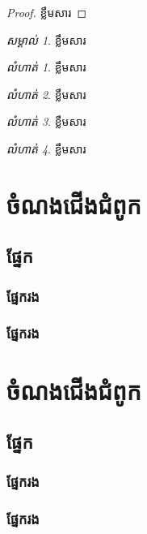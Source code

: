 \documentclass[a4paper,12pt,twoside]{book}
\newcommand{\KhOSML}{\fontspec[Script=Khmer]{Khmer OS Muol Light} \selectfont}
\theoremstyle{plain}
\theoremstyle{definition}
\theoremstyle{remark}
\newtheorem{remark}{\KhOSML សម្គាល់}%
\newtheorem{exercise}{\KhOSML លំហាត់}[chapter]
\begin{document}
\begin{proof}
ខ្លឹមសារ
\end{proof}

\begin{remark}
ខ្លឹមសារ
\end{remark}

\begin{exercise}
ខ្លឹមសារ
\end{exercise}

\begin{exercise}
ខ្លឹមសារ
\end{exercise}

\begin{exercise}
ខ្លឹមសារ
\end{exercise}

\begin{exercise}
ខ្លឹមសារ
\end{exercise}

\chapter{ចំណងជើងជំពូក}

\section{ផ្នែក}

\subsection{ផ្នែករង}

\subsection{ផ្នែករង}

\chapter{ចំណងជើងជំពូក}

\section{ផ្នែក}

\subsection{ផ្នែករង}

\subsection{ផ្នែករង}
\end{document}

